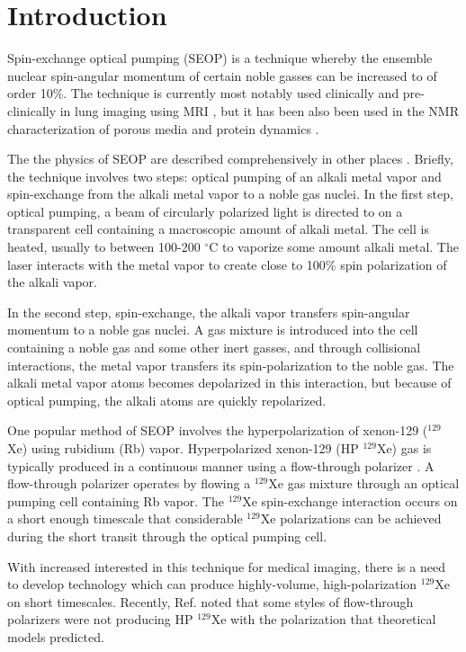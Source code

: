 \section{\label{sec:intro}Introduction}
Spin-exchange optical pumping (SEOP) is a technique whereby the ensemble nuclear spin-angular momentum of certain noble gasses can be increased to of order 10\%. The technique is currently most notably used clinically and pre-clinically in lung imaging using MRI \cite{Oros2004HyperpolarizedMRI}, but it has been also been used in the NMR characterization of porous media \cite{Terskikh2002AMaterials} and protein dynamics \cite{Schroder2013XenonAlert}. 

The the physics of SEOP are described comprehensively in other places \cite{Walker2011, Appelt1998Theory129Xe}. Briefly, the technique involves two steps: optical pumping of an alkali metal vapor and spin-exchange from the alkali metal vapor to a noble gas nuclei. In the first step, optical pumping, a beam of circularly polarized light is directed to on a transparent cell containing a macroscopic amount of alkali metal. The cell is heated, usually to between 100-200 $^{\circ}$C to vaporize some amount alkali metal. The laser interacts with the metal vapor to create close to 100\% spin polarization of the alkali vapor.

In the second step, spin-exchange, the alkali vapor transfers spin-angular momentum to a noble gas nuclei. A gas mixture is introduced into the cell containing a noble gas and some other inert gasses, and through collisional interactions, the metal vapor transfers its spin-polarization to the noble gas. The alkali metal vapor atoms becomes depolarized in this interaction, but because of optical pumping, the alkali atoms are quickly repolarized.

One popular method of SEOP involves the hyperpolarization of xenon-129 ($^{129}$Xe) using rubidium (Rb) vapor. Hyperpolarized xenon-129 (HP $^{129}$Xe) gas is typically produced in a continuous manner using a flow-through polarizer \cite{Driehuys1996High-volume129Xe, Ruset2006Optical129Xe, Schrank2009a}. A flow-through polarizer operates by flowing a $^{129}$Xe gas mixture through an optical pumping cell containing Rb vapor. The $^{129}$Xe spin-exchange interaction occurs on a short enough timescale that considerable $^{129}$Xe polarizations can be achieved during the short transit through the optical pumping cell.

With increased interested in this technique for medical imaging, there is a need to develop technology which can produce highly-volume, high-polarization $^{129}$Xe on short timescales. Recently, Ref. \cite{Freeman2014} noted that some styles of flow-through polarizers were not producing HP $^{129}$Xe with the polarization that theoretical models predicted. 

